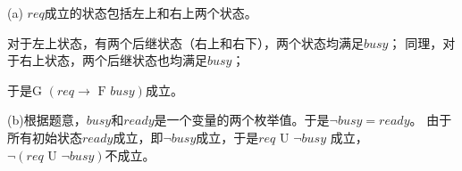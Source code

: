\begin{solution}
    (a) $req$成立的状态包括左上和右上两个状态。
    
    对于左上状态，有两个后继状态（右上和右下），两个状态均满足$busy$；
    同理，对于右上状态，两个后继状态也均满足$busy$；

    于是$\textrm{G }(req \rightarrow \textrm{ F } busy)$成立。
    
    (b)根据题意，$busy$和$ready$是一个变量的两个枚举值。于是$\neg busy = ready$。
    由于所有初始状态$ready$成立，即$\neg busy$成立，于是$req \textrm{ U } \neg busy$
    成立，$\neg(req \textrm{ U } \neg busy)$不成立。
\end{solution}